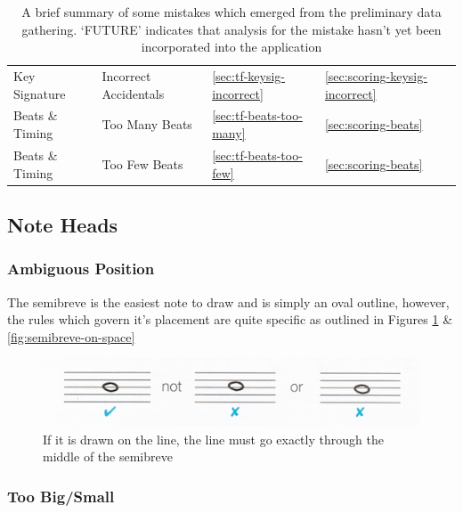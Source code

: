 \begin{table}[H]
\begin{tabularx}{\textwidth}{ llll }
        Key Signature   & Incorrect Accidentals  & \cref{sec:tf-keysig-incorrect}            & \cref{sec:scoring-keysig-incorrect} \\
        Beats \& Timing & Too Many Beats         & \cref{sec:tf-beats-too-many}              & \cref{sec:scoring-beats}\\
        Beats \& Timing & Too Few Beats          & \cref{sec:tf-beats-too-few}               & \cref{sec:scoring-beats}\\
        \bottomrule
    \end{tabularx}
    \caption{A brief summary of some mistakes which emerged from the preliminary data gathering. `FUTURE' indicates that analysis for the mistake hasn't yet been incorporated into the application}
    \label{table:teacher-feedback-summary}
\end{table}

\subsection{Note Heads}
\subsubsection{Ambiguous Position}\label{sec:tf-note-head-ambiguous}

The semibreve is the easiest note to draw and is simply an oval outline, however, the rules which govern it's placement are quite specific as outlined in Figures \cref{fig:semibreve-on-line} \& \cref{fig:semibreve-on-space}

\begin{figure}[width=.8\textwidth][h!]
  \includegraphics[width=\linewidth]{gfx/basic/semibreve-on-line.png}
  \centering
  \caption{If it is drawn on the line, the line must go exactly through the middle of the semibreve}
  \label{fig:semibreve-on-line}
\end{figure}


\subsubsection{Too Big/Small}\label{sec:tf-note-head-scale}

